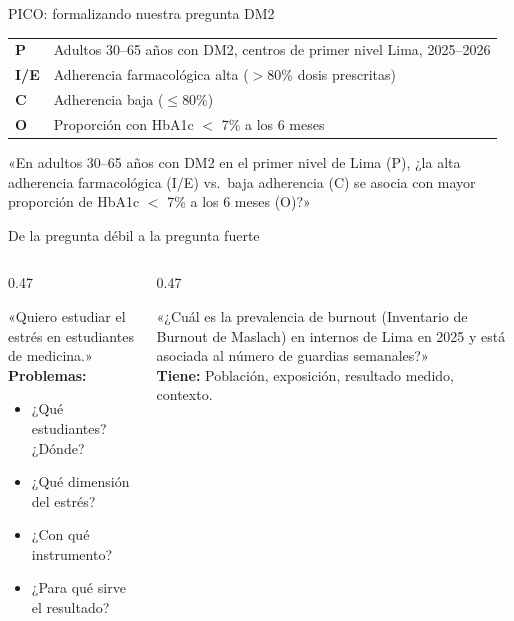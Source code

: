 \documentclass[12pt, aspectratio=169]{beamer}
\begin{document}
\begin{frame}{PICO: formalizando nuestra pregunta DM2}
  \begin{examplebox}
    \small
    \begin{tabular}{@{}lp{}@{}}
      \textbf{P} & Adultos 30--65 años con DM2, centros de primer nivel Lima,
                   2025--2026 \\[1pt]
      \textbf{I/E} & Adherencia farmacológica alta ($>$80\% dosis prescritas) \\[1pt]
      \textbf{C} & Adherencia baja ($\leq$80\%) \\[1pt]
      \textbf{O} & Proporción con HbA1c $<$ 7\% a los 6 meses \\
    \end{tabular}
  \end{examplebox}

  \smallskip
  \begin{keybox}
    \small
    «En adultos 30--65 años con DM2 en el primer nivel de Lima (P),
    ¿la alta adherencia farmacológica (I/E) vs.\ baja adherencia (C)
    se asocia con mayor proporción de HbA1c $<$ 7\% a los 6 meses (O)?»
  \end{keybox}
\end{frame}

\begin{frame}{De la pregunta débil a la pregunta fuerte}
  \begin{columns}[T]
    \begin{column}{0.47\textwidth}
      \begin{warningbox}
        \small
        «Quiero estudiar el estrés en estudiantes de medicina.»\\[4pt]
        \textbf{Problemas:}
        \begin{itemize}
          \item ¿Qué estudiantes? ¿Dónde?
          \item ¿Qué dimensión del estrés?
          \item ¿Con qué instrumento?
          \item ¿Para qué sirve el resultado?
        \end{itemize}
      \end{warningbox}
    \end{column}
    \begin{column}{0.47\textwidth}
      \begin{examplebox}
        \small
        «¿Cuál es la prevalencia de burnout
        (Inventario de Burnout de Maslach)
        en internos de Lima en 2025 y está
        asociada al número de guardias
        semanales?»\\[4pt]
        \textbf{Tiene:} Población, exposición,
        resultado medido, contexto.
      \end{examplebox}
    \end{column}
  \end{columns}
\end{frame}
\end{document}
